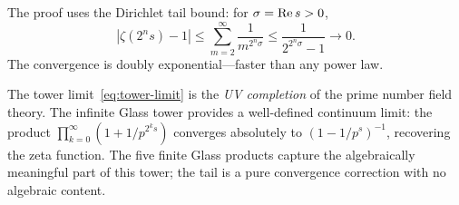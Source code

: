 The proof uses the Dirichlet tail bound: for $\sigma = \operatorname{Re} s > 0$,
\[
  |\zeta(2^n s) - 1| \leq \sum_{m=2}^{\infty} \frac{1}{m^{2^n \sigma}}
  \leq \frac{1}{2^{2^n \sigma} - 1} \to 0.
\]
The convergence is doubly exponential---faster than any power law.

\begin{principle}[UV Completion]
The tower limit~\eqref{eq:tower-limit} is the
\emph{UV completion} of the prime number field theory. The infinite
Glass tower provides a well-defined continuum limit: the product
$\prod_{k=0}^{\infty}(1 + 1/p^{2^k s})$ converges absolutely to
$(1 - 1/p^s)^{-1}$, recovering the zeta function. The five
finite Glass products capture the algebraically meaningful part
of this tower; the tail is a pure convergence correction with
no algebraic content.
\end{principle}
